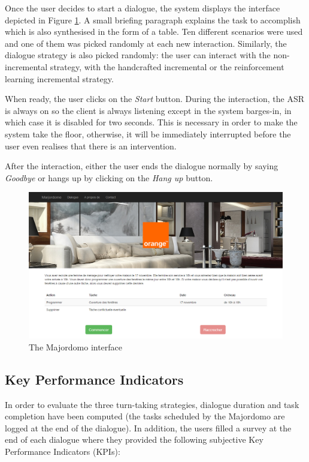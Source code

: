 		Once the user decides to start a dialogue, the system displays the interface depicted in Figure \ref{fig:majordomo}. A small briefing paragraph explains the task to accomplish which is also synthesised in the form of a table. Ten different scenarios were used and one of them was picked randomly at each new interaction. Similarly, the dialogue strategy is also picked randomly: the user can interact with the non-incremental strategy, with the handcrafted incremental or the reinforcement learning incremental strategy.
		
		When ready, the user clicks on the \textit{Start} button. During the interaction, the ASR is always on so the client is always listening except in the system barges-in, in which case it is disabled for two seconds. This is necessary in order to make the system take the floor, otherwise, it will be immediately interrupted before the user even realises that there is an intervention.
		
		After the interaction, either the user ends the dialogue normally by saying \textit{Goodbye} or hangs up by clicking on the \textit{Hang up} button.
	
	\begin{figure}[t]
		\centering
		\includegraphics[scale=0.48]{figures/majordome.png}
		\caption{The Majordomo interface}
		\label{fig:majordomo}
	\end{figure}
	
	\subsection{Key Performance Indicators}
	
		In order to evaluate the three turn-taking strategies, dialogue duration and task completion have been computed (the tasks scheduled by the Majordomo are logged at the end of the dialogue). In addition, the users filled a survey at the end of each dialogue where they provided the following subjective Key Performance Indicators (KPIs):
		
